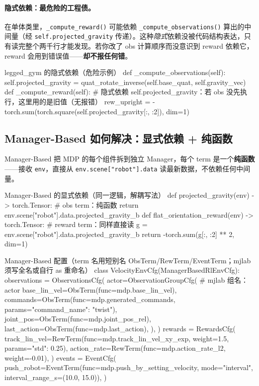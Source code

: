 \paragraph{隐式依赖：最危险的工程债。}在单体类里，\verb|_compute_reward()| 可能依赖 \verb|_compute_observations()| 算出的中间量（经 \verb|self.projected_gravity| 传递）。这种\emph{隐式}依赖没被代码结构表达，只有读完整个两千行才能发现。若你改了 obs 计算顺序而没意识到 reward 依赖它，reward 会用到错误值——\textbf{却不报任何错}。

\begin{codebox}[Python]{legged\_gym 的隐式依赖（危险示例）}
def _compute_observations(self):
    self.projected_gravity = quat_rotate_inverse(self.base_quat, self.gravity_vec)
def _compute_reward(self):
    # 隐式依赖 self.projected_gravity：若 obs 没先执行，这里用的是旧值（无报错）
    rew_upright = -torch.sum(torch.square(self.projected_gravity[:, :2]), dim=1)
\end{codebox}

\subsection{Manager-Based 如何解决：显式依赖 + 纯函数}

Manager-Based 把 MDP 的每个组件拆到独立 Manager，每个 term 是一个\textbf{纯函数}——接收 \verb|env|，直接从 \verb|env.scene["robot"].data| 读最新数据，不依赖任何中间量。

\begin{codebox}[Python]{Manager-Based 的显式依赖（同一逻辑，解耦写法）}
def projected_gravity(env) -> torch.Tensor:           # obs term：纯函数
    return env.scene["robot"].data.projected_gravity_b
def flat_orientation_reward(env) -> torch.Tensor:     # reward term：同样直接读
    g = env.scene["robot"].data.projected_gravity_b
    return -torch.sum(g[:, :2] ** 2, dim=1)
\end{codebox}

\begin{codebox}[Python]{Manager-Based 配置（term 名用短别名 ObsTerm/RewTerm/EventTerm；mjlab 须写全名或自行 as 重命名）}
class VelocityEnvCfg(ManagerBasedRlEnvCfg):
    observations = ObservationsCfg(
        actor=ObservationGroupCfg(                    # mjlab 组名：actor
            base_lin_vel=ObsTerm(func=mdp.base_lin_vel),
            commands=ObsTerm(func=mdp.generated_commands,
                             params={"command_name": "twist"}),
            joint_pos=ObsTerm(func=mdp.joint_pos_rel),
            last_action=ObsTerm(func=mdp.last_action),
        ),
    )
    rewards = RewardsCfg(
        track_lin_vel=RewTerm(func=mdp.track_lin_vel_xy_exp, weight=1.5,
                              params={"std": 0.25}),
        action_rate=RewTerm(func=mdp.action_rate_l2, weight=-0.01),
    )
    events = EventCfg(
        push_robot=EventTerm(func=mdp.push_by_setting_velocity,
                             mode="interval", interval_range_s=(10.0, 15.0)),
    )
\end{codebox}

